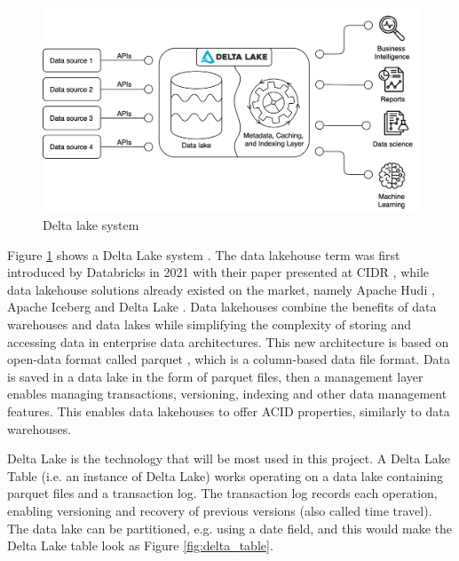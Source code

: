 \begin{figure}[!ht]
    \begin{center}
      \includegraphics[width=\textwidth]{figures/2-background/DeltaLake_evolution-DeltaLake.png}
    \end{center}
    \caption{Delta lake system}
    \label{fig:DeltaLake}
\end{figure}

Figure \ref{fig:DeltaLake} shows a Delta Lake system \cite{armbrustDeltaLakeHighperformance2020}. The data lakehouse term was first introduced by Databricks in 2021 with their paper presented at \gls{CIDR} \cite{lakehouse2021}, while data lakehouse solutions already existed on the market, namely Apache Hudi \cite{rajaperumalUberEngineeringIncremental2017}, Apache Iceberg \cite{ApacheIcebergApache} and Delta Lake \cite{armbrustDeltaLakeHighperformance2020}. Data lakehouses combine the benefits of data warehouses and data lakes while simplifying the complexity of storing and accessing data in enterprise data architectures. This new architecture is based on open-data format called parquet \cite{Parquet}, which is a column-based data file format. Data is saved in a data lake in the form of parquet files, then a management layer enables managing transactions, versioning, indexing and other data management features. This enables data lakehouses to offer \gls{ACID} properties, similarly to data warehouses. 

Delta Lake is the technology that will be most used in this project. A Delta Lake Table (i.e. an instance of Delta Lake) works operating on a data lake containing parquet files and a transaction log. The transaction log records each operation, enabling versioning and recovery of previous versions (also called time travel). The data lake can be partitioned, e.g. using a date field, and this would make the Delta Lake table look as Figure \ref{fig:delta_table}. 

